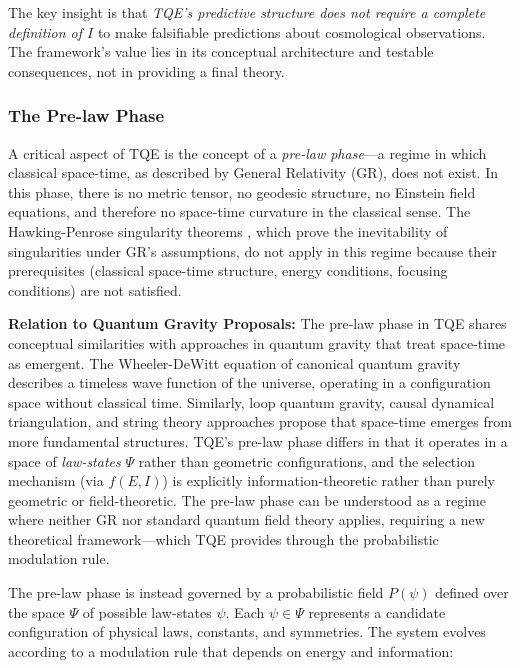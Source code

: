 \documentclass[12pt,a4paper]{article}
\theoremstyle{definition}
\theoremstyle{remark}
\begin{document}
The key insight is that \textit{TQE's predictive structure does not require a complete definition of $I$} to make falsifiable predictions about cosmological observations. The framework's value lies in its conceptual architecture and testable consequences, not in providing a final theory.

\subsubsection{The Pre-law Phase}

A critical aspect of TQE is the concept of a \emph{pre-law phase}—a regime in which classical space-time, as described by General Relativity (GR), does not exist. In this phase, there is no metric tensor, no geodesic structure, no Einstein field equations, and therefore no space-time curvature in the classical sense. The Hawking-Penrose singularity theorems \cite{hawking1970singularities, penrose1965gravitational}, which prove the inevitability of singularities under GR's assumptions, do not apply in this regime because their prerequisites (classical space-time structure, energy conditions, focusing conditions) are not satisfied.

\textbf{Relation to Quantum Gravity Proposals:} The pre-law phase in TQE shares conceptual similarities with approaches in quantum gravity that treat space-time as emergent. The Wheeler-DeWitt equation of canonical quantum gravity describes a timeless wave function of the universe, operating in a configuration space without classical time. Similarly, loop quantum gravity, causal dynamical triangulation, and string theory approaches propose that space-time emerges from more fundamental structures. TQE's pre-law phase differs in that it operates in a space of \emph{law-states} $\Psi$ rather than geometric configurations, and the selection mechanism (via $f(E,I)$) is explicitly information-theoretic rather than purely geometric or field-theoretic. The pre-law phase can be understood as a regime where neither GR nor standard quantum field theory applies, requiring a new theoretical framework—which TQE provides through the probabilistic modulation rule.

The pre-law phase is instead governed by a probabilistic field $P(\psi)$ defined over the space $\Psi$ of possible law-states $\psi$. Each $\psi \in \Psi$ represents a candidate configuration of physical laws, constants, and symmetries. The system evolves according to a modulation rule that depends on energy and information:
\end{document}
